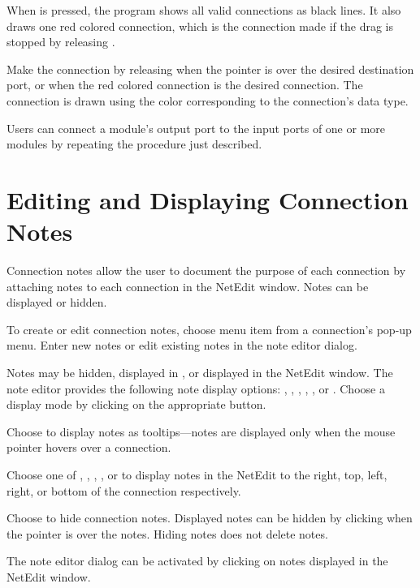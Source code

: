 When  is pressed, the program shows all valid connections as black
lines.  It also draws one red colored connection, which is the
connection made if the drag is stopped by releasing .

Make the connection by releasing  when the pointer is over the
desired destination port, or when the red colored connection is the
desired connection.  The connection is drawn using the color
corresponding to the connection's data type.

Users can connect a module's output port to the input ports of one or more
modules by repeating the procedure just described.

\section{Editing and Displaying Connection Notes}
\label{sec:displaynotes}

Connection notes allow the user to document the purpose of
each connection by attaching notes to each connection in the NetEdit window.
Notes can be displayed or hidden.

To create or edit connection notes, choose menu item  from
a connection's pop-up menu. Enter new notes or edit existing notes in
the note editor dialog.

Notes may be hidden, displayed in , or displayed in the
NetEdit window.  The note editor provides the following note display
options: , , ,
, , or .  Choose a
display mode by clicking  on the appropriate button.

Choose  to display notes as tooltips---notes are
displayed only when the mouse pointer hovers over a connection.

Choose one of , , ,
, or  to display notes in the
NetEdit to the right, top, left, right, or bottom of the connection
respectively. 

Choose  to hide connection notes.  Displayed notes can be
hidden by clicking  when the pointer is over the
notes.  Hiding notes does not delete notes.

The note editor dialog can be activated by clicking 
on notes displayed in the NetEdit window.

